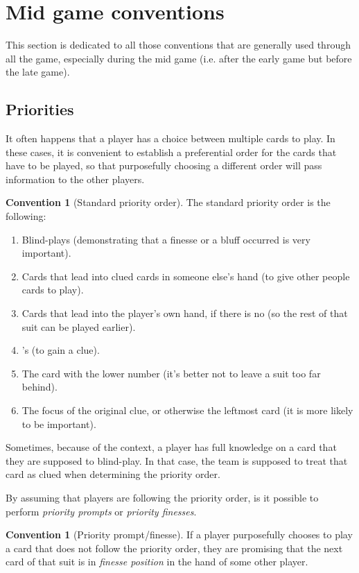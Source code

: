 \documentclass[a4paper]{article}
\theoremstyle{plain}
\theoremstyle{definition}
\newtheorem{convention}[theorem]{Convention}
\begin{document}
\section{Mid game conventions}

This section is dedicated to all those conventions that are generally used through all the game, especially during the mid game (i.e. after the early game but before the late game).

\subsection{Priorities}
\label{ssec:priorities}

It often happens that a player has a choice between multiple cards to play. In these cases, it is convenient to establish a preferential order for the cards that have to be played, so that purposefully choosing a different order will pass information to the other players.

\begin{convention}[Standard priority order]
	The standard priority order is the following:
	\begin{enumerate}
		\item Blind-plays (demonstrating that a finesse or a bluff occurred is very important).
		\item Cards that lead into clued cards in someone else's hand (to give other people cards to play).
		\item Cards that lead into the player's own hand, if there is no  (so the rest of that suit can be played earlier).
		\item {}'s (to gain a clue).
		\item The card with the lower number (it's better not to leave a suit too far behind).
		\item The focus of the original clue, or otherwise the leftmost card (it is more likely to be important).
	\end{enumerate}
\end{convention}

Sometimes, because of the context, a player has full knowledge on a card that they are supposed to blind-play. In that case, the team is supposed to treat that card as clued when determining the priority order.

By assuming that players are following the priority order, is it possible to perform \emph{priority prompts} or \emph{priority finesses}.

\begin{convention}[Priority prompt/finesse]
	If a player purposefully chooses to play a card that does not follow the priority order, they are promising that the next card of that suit is in \emph{finesse position} in the hand of some other player.
\end{convention}
\end{document}
